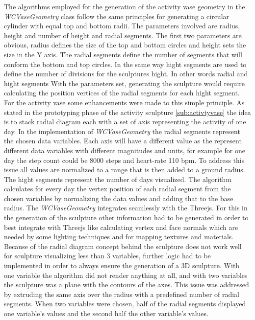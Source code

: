 \documentclass[../medieninformatik-arbeit.tex]{subfiles}
\begin{document}
The algorithms employed for the generation of the activity vase geometry in the \textit{WCVaseGeometry} class follow the same principles for generating a circular cylinder with equal top and bottom radii. The parameters involved are radius, height and number of height and radial segments. The first two parameters are obvious, radius defines the size of the top and bottom circles and height sets the size in the Y axis. The radial segments define the number of segments that will conform the bottom and top circles. In the same way hight segments are used to define the number of divisions for the sculptures hight. In other words radial and hight segments  With the parameters set, generating the sculpture would require calculating the position vertices of the radial segments for each hight segment. For the activity vase some enhancements were made to this simple principle. As stated in the prototyping phase of the activity sculpture \ref{sub:activtyvase} the idea is to stack radial diagram each with a set of axis representing the activity of one day. In the implementation of \textit{WCVaseGeometry} the radial segments represent the chosen data variables. Each axis will have a different value as the represent different data variables with different magnitudes and units, for example for one day the step count could be 8000 steps and heart-rate 110 bpm. To address this issue all values are normalized to a range that is then added to a ground radius. The hight segments represent the number of days visualized. The algorithm calculates for every day the vertex position of each radial segment from the chosen variables by normalizing the data values and adding that to the base radius. The \textit{WCVaseGeometry} integrates seamlessly with the Threejs. For this in the generation of the sculpture other information had to be generated in order to best integrate with Threejs like calculating vertex and face normals which are needed by some lighting techniques and for mapping textures and materials. Because of the radial diagram concept behind the sculpture does not work well for sculpture visualizing less than 3 variables, further logic had to be implemented in order to always ensure the generation of a 3D sculpture. With one variable the algorithm did not render anything at all, and with two variables the sculpture was a plane with the contours of the axes. This issue was addressed by extruding the same axis over the radius with a predefined number of radial segments. When two variables were chosen, half of the radial segments displayed one variable's values and the second half the other variable's values.  
\end{document}
